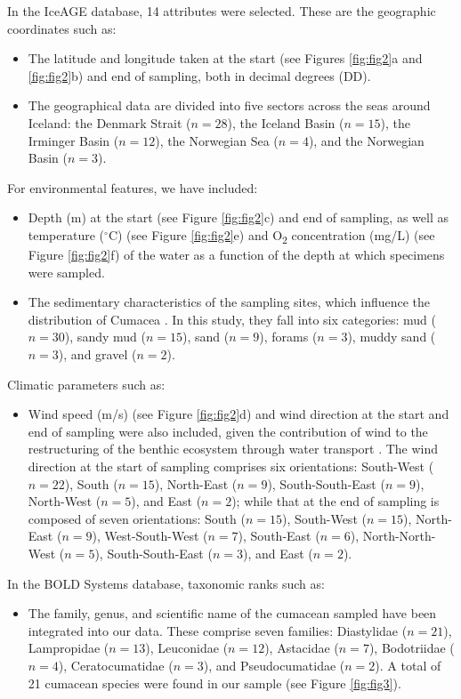 In the IceAGE database, 14 attributes were selected. These are the geographic coordinates such as: 

\begin{itemize}
\item The latitude and longitude taken at the start (see Figures \ref{fig:fig2}a and \ref{fig:fig2}b) and end of sampling, both in decimal degrees (DD).
\item The geographical data are divided into five sectors across the seas around Iceland: the Denmark Strait ($n=28$), the Iceland Basin ($n=15$), the Irminger Basin ($n=12$), the Norwegian Sea ($n=4$), and the Norwegian Basin ($n=3$). 
\end{itemize}

For environmental features, we have included:
\begin{itemize}
\item Depth (m) at the start (see Figure \ref{fig:fig2}c) and end of sampling, as well as temperature ($^\circ$C) (see Figure \ref{fig:fig2}e) and O\textsubscript{2} concentration (mg/L) (see Figure \ref{fig:fig2}f) of the water as a function of the depth at which specimens were sampled. 
\item The sedimentary characteristics of the sampling sites, which influence the distribution of Cumacea \citep{uhlir_adding_2021}. In this study, they fall into six categories: mud ($n=30$), sandy mud ($n=15$), sand ($n=9$), forams ($n=3$), muddy sand ($n=3$), and gravel ($n=2$).
\end{itemize}

Climatic parameters such as: 
\begin{itemize}
\item Wind speed (m/s) (see Figure \ref{fig:fig2}d) and wind direction at the start and end of sampling were also included, given the contribution of wind to the restructuring of the benthic ecosystem through water transport \citep{waga_recent_2020,saeedi_environmental_2022}. The wind direction at the start of sampling comprises six orientations: South-West ($n=22$), South ($n=15$), North-East ($n=9$), South-South-East ($n=9$), North-West ($n=5$), and East ($n=2$); while that at the end of sampling is composed of seven orientations: South ($n=15$), South-West ($n=15$), North-East ($n=9$), West-South-West ($n=7$), South-East ($n=6$), North-North-West ($n=5$), South-South-East ($n=3$), and East ($n=2$). 
\end{itemize}

In the BOLD Systems database, taxonomic ranks such as: 
\begin{itemize}
\item The family, genus, and scientific name of the cumacean sampled have been integrated into our data. These comprise seven families: Diastylidae ($n=21$), Lampropidae ($n=13$), Leuconidae ($n=12$), Astacidae ($n=7$), Bodotriidae ($n=4$), Ceratocumatidae ($n=3$), and Pseudocumatidae ($n=2$). A total of 21 cumacean species were found in our sample (see Figure \ref{fig:fig3}).
\end{itemize}

